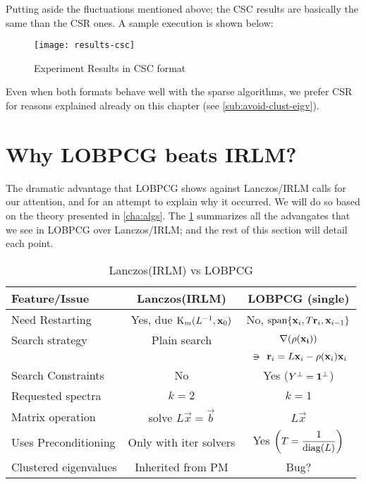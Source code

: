 Putting aside the fluctuations mentioned above; the CSC results are
basically the same than the CSR ones. A sample execution is shown
below: 

\begin{figure}[H]
  \centering
  \caption{Experiment Results in CSC format}   
  \texttt{[image: results-csc]}
\end{figure}

Even when both formats behave well with the sparse algorithms, we
prefer CSR for reasons explained already on this chapter (see
\cref{sub:avoid-clust-eigv}). 

\section{Why \gls{LOBPCG} beats \gls{IRLM}?}
\label{sec:why-lobpcg}

The dramatic advantage that \gls{LOBPCG} shows against
Lanczos/\gls{IRLM} calls for our attention, and for an attempt to
explain why it occurred. We will do so based on the theory presented
in \cref{cha:algs}. The \cref{tab:lanczos-vs-lobpcg} summarizes all
the advangates 
that we see in \gls{LOBPCG} over Lanczos/\gls{IRLM}; and the rest of
this section will detail each point.

\begin{table}[h]  
  \caption{Lanczos(IRLM) vs LOBPCG}\label{tab:lanczos-vs-lobpcg}
  \begin{tabular}{l | c | c | }
    Feature/Issue & Lanczos(IRLM) & LOBPCG (single) \\
    \hline \hline
    Need Restarting &
    Yes, due $\Krylov{\inv{L}}{\vec{x}_0}{m}$ &
    No, $\func{span} \{\vec{x}_i, T\vec{r}_i, \vec{x}_{i-1}\}$ \\
    \hline
    Search strategy &
    Plain search &
    $\nabla (\func{\rho}(\vec{x_i}))$ \\
    &
    &
    $\suchthat \vec{r}_i = L\vec{x}_i - \func{\rho}(\vec{x}_i)\vec{x}_i$\\
    \hline
    Search Constraints &
    No &
    Yes ($\ortc{Y} = \ortc{\vec{1}}$) \\
    \hline
    Requested spectra &
    $k=2$ &
    $k=1$ \\      
    \hline
    Matrix operation &
    solve $L\vec{x} = \vec{b}$ &
    $L\vec{x}$ \\
    \hline      
    Uses Preconditioning &
    Only with iter solvers &
    Yes $\left(T = \dfrac{1}{\func{diag}(L)} \right)$ \\
    \hline
    Clustered eigenvalues &
    Inherited from PM &
    Bug? \\      
    \hline
  \end{tabular}
\end{table}

